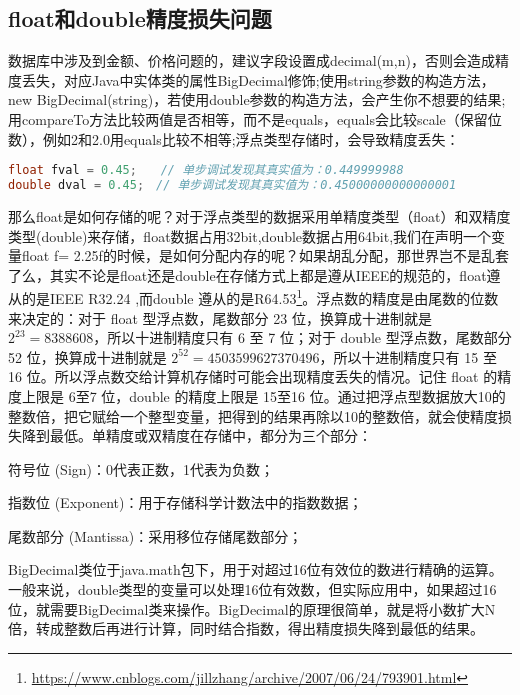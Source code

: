 \documentclass[../../../interview-questions.tex]{subfiles}
\begin{document}
\subsection{float和double精度损失问题}

数据库中涉及到金额、价格问题的，建议字段设置成decimal(m,n)，否则会造成精度丢失，对应Java中实体类的属性BigDecimal修饰;使用string参数的构造方法，new  BigDecimal(string)，若使用double参数的构造方法，会产生你不想要的结果;用compareTo方法比较两值是否相等，而不是equals，equals会比较scale（保留位数），例如2和2.0用equals比较不相等;浮点类型存储时，会导致精度丢失：

\begin{lstlisting}[language=Java]
float fval = 0.45;　　// 单步调试发现其真实值为：0.449999988
double dval = 0.45;　// 单步调试发现其真实值为：0.45000000000000001
\end{lstlisting}

那么float是如何存储的呢？对于浮点类型的数据采用单精度类型（float）和双精度类型(double)来存储，float数据占用32bit,double数据占用64bit,我们在声明一个变量float f= 2.25f的时候，是如何分配内存的呢？如果胡乱分配，那世界岂不是乱套了么，其实不论是float还是double在存储方式上都是遵从IEEE的规范的，float遵从的是IEEE R32.24 ,而double 遵从的是R64.53\footnote{\url{https://www.cnblogs.com/jillzhang/archive/2007/06/24/793901.html}}。浮点数的精度是由尾数的位数来决定的：对于 float 型浮点数，尾数部分 23 位，换算成十进制就是 $2^{23}=8388608$，所以十进制精度只有 6 至 7 位；对于 double 型浮点数，尾数部分 52 位，换算成十进制就是 $2^{52} = 4503599627370496$，所以十进制精度只有 15 至 16 位。所以浮点数交给计算机存储时可能会出现精度丢失的情况。记住 float 的精度上限是 6至7 位，double 的精度上限是 15至16 位。通过把浮点型数据放大10的整数倍，把它赋给一个整型变量，把得到的结果再除以10的整数倍，就会使精度损失降到最低。单精度或双精度在存储中，都分为三个部分：

符号位 (Sign)：0代表正数，1代表为负数；

指数位 (Exponent)：用于存储科学计数法中的指数数据；

尾数部分 (Mantissa)：采用移位存储尾数部分；

BigDecimal类位于java.math包下，用于对超过16位有效位的数进行精确的运算。一般来说，double类型的变量可以处理16位有效数，但实际应用中，如果超过16位，就需要BigDecimal类来操作。BigDecimal的原理很简单，就是将小数扩大N倍，转成整数后再进行计算，同时结合指数，得出精度损失降到最低的结果。
\end{document}
